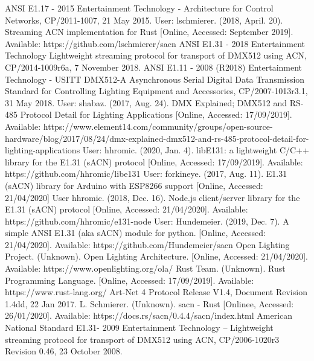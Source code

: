 \documentclass[11pt,a4paper]{article}
\begin{document}
\begin{thebibliography}{20}	
	ANSI E1.17 - 2015 Entertainment Technology - Architecture for Control Networks, CP/2011-1007, 21 May 2015.
	User: lschmierer. (2018, April. 20). Streaming ACN implementation for Rust [Online, Accessed: September 2019]. Available: https://github.com/lschmierer/sacn
	ANSI E1.31 - 2018 Entertainment Technology Lightweight streaming protocol for transport of DMX512 using ACN, CP/2014-1009r6a, 7 November 2018.
	ANSI E1.11 - 2008 (R2018) Entertainment Technology - USITT DMX512-A  Asynchronous Serial Digital Data Transmission Standard for Controlling Lighting Equipment and Accessories, CP/2007-1013r3.1, 31 May 2018.
	User: shabaz. (2017, Aug. 24). DMX Explained; DMX512 and RS-485 Protocol Detail for Lighting Applications [Online, Accessed: 17/09/2019]. Available: https://www.element14.com/community/groups/open-source-hardware/blog/2017/08/24/dmx-explained-dmx512-and-rs-485-protocol-detail-for-lighting-applications
	User: hhromic. (2020, Jan. 4). libE131: a lightweight C/C++ library for the E1.31 (sACN) protocol [Online, Accessed: 17/09/2019]. Available: https://github.com/hhromic/libe131
	User: forkineye. (2017, Aug. 11). E1.31 (sACN) library for Arduino with ESP8266 support [Online, Accessed: 21/04/2020]
	User hhromic. (2018, Dec. 16). Node.js client/server library for the E1.31 (sACN) protocol [Online, Accessed: 21/04/2020]. Available: https://github.com/hhromic/e131-node
	User: Hundemeier. (2019, Dec. 7). A simple ANSI E1.31 (aka sACN) module for python. [Online, Accessed: 21/04/2020]. Available: https://github.com/Hundemeier/sacn
	Open Lighting Project. (Unknown). Open Lighting Architecture. [Online, Accessed: 21/04/2020]. Available: https://www.openlighting.org/ola/
	Rust Team. (Unknown). Rust Programming Language. [Online, Accessed: 17/09/2019]. Available: https://www.rust-lang.org/
	Art-Net 4 Protocol Release V1.4, Document Revision 1.4dd, 22 Jan 2017.
	L. Schmierer. (Unknown). sacn - Rust [Onlinee, Accessed: 26/01/2020]. Available: https://docs.rs/sacn/0.4.4/sacn/index.html
	American National Standard E1.31- 2009 Entertainment Technology – Lightweight streaming protocol for transport of DMX512 using ACN, CP/2006-1020r3 Revision 0.46, 23 October 2008.

\end{thebibliography}
\end{document}
